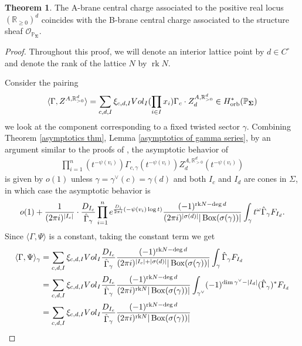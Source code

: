 \documentclass[11pt,reqno]{amsart}
\def\rk {{\operatorname{rk}}}
\def\R {{\mathbb R}}
\def\PP {{\mathbb P}}
\def\Vol {{\rm Vol}}
\theoremstyle{definition}
\newtheorem{theorem}{Theorem}[section]
\numberwithin{equation}{section}
\begin{document}
\begin{theorem}
	The A-brane central charge associated to the positive real locus $(\R_{\geq 0})^d$ coincides with the B-brane central charge associated to the structure sheaf $\mathcal{O}_{\PP_{\mathbf{\Sigma}}}$.
\end{theorem}
\begin{proof}
Throughout this proof, we will denote an interior lattice point by $d\in C^{\circ}$ and denote the rank of the lattice $N$ by $\rk N$.

	Consider the pairing
	\begin{align*}
		\langle \Gamma,Z^{A,\R_{>0}^d} \rangle=\sum_{c,d,I}\xi_{c,d,I}\Vol_I(\prod_{i\in I}x_i)\Gamma_c\cdot Z^{A,\R_{>0}^d}_d\in H_{\mathrm{orb}}^*(\PP_{\mathbf{\Sigma}})
	\end{align*}
	we look at the component corresponding to a fixed twisted sector $\gamma$. Combining Theorem \ref{asymptotics thm}, Lemma \ref{asymptotics of gamma series}, by an argument similar to the proofs of \cite[Proposition 3.12, 3.13]{BHanDuality}, the asymptotic behavior of
	\begin{align*}
		\prod_{i=1}^n(t^{-\psi(v_i)})\Gamma_{c,\gamma}(t^{-\psi(v_i)})Z^{A,\R_{>0}^d}_d(t^{-\psi(v_i)})
	\end{align*}
	is given by $o(1)$ unless $\gamma=\gamma^{\vee}(c)=\gamma(d)$ and both $I_c$ and $I_d$ are cones in $\Sigma$, in which case the asymptotic behavior is
	\begin{align*}
		o(1)+\frac{1}{(2\pi{\rm i})^{|I_c|}}\cdot \frac{D_{I_c}}{\hat{\Gamma}_{\gamma}}\prod_{i=1}^n {\rm e}^{\frac{D_i}{2\pi {\rm i}}(-\psi(v_i)\log t)}\frac{(-1)^{\rk N-\deg d}}{(2\pi{\rm i})^{|\sigma(d)|}|\operatorname{Box}(\sigma(\gamma))|}\int_{\gamma} t^{\omega}\hat{\Gamma}_{\gamma} F_{I_d}.
	\end{align*}
	Since $\langle \Gamma,\Psi \rangle$ is a constant, taking the constant term we get
	\begin{align*}
		\langle \Gamma,\Psi \rangle_{\gamma}&=\sum_{c,d,I}\xi_{c,d,I}\Vol_I \frac{D_{I_c}}{\hat{\Gamma}_{\gamma}}\frac{(-1)^{\rk N-\deg d}}{(2\pi{\rm i})^{|I_c|+|\sigma(d)|}|\operatorname{Box}(\sigma(\gamma))|}\int_{\gamma}\hat{\Gamma}_{\gamma} F_{I_d}\\
		&=\sum_{c,d,I}\xi_{c,d,I}\Vol_I \frac{D_{I_c}}{\hat{\Gamma}_{\gamma}}\frac{(-1)^{\rk N-\deg d}}{(2\pi{\rm i})^{\rk N}|\operatorname{Box}(\sigma(\gamma))|}\int_{\gamma^{\vee}} (-1)^{\dim\gamma^{\vee}-|I_d|} (\hat{\Gamma}_{\gamma})^* F_{I_d}\\
		&=\sum_{c,d,I}\xi_{c,d,I}\Vol_I \frac{D_{I_c}}{\hat{\Gamma}_{\gamma}}\frac{(-1)^{\rk N-\deg d}}{(2\pi{\rm i})^{\rk N}|\operatorname{Box}(\sigma(\gamma))|}\\

\end{align*}
\end{proof}
\end{document}
